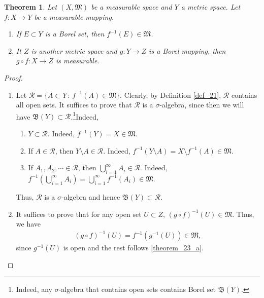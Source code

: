 \documentclass[11pt]{book}
\newtheorem{theorem}{Theorem}[chapter]
\theoremstyle{definition}
\numberwithin{equation}{chapter}
\def\BB{\mathfrak{B}}
\begin{document}
\begin{theorem}\label{theorem_23}
Let $(X,\mathfrak{M})$ be a measurable space and $Y$ a metric space. Let $f:X\to Y$ be a measurable mapping.
\begin{enumerate}[label=(\alph*)]
    \item If $E \subset Y$ is a Borel set, then $f^{-1}(E) \in \mathfrak{M}$.\label{theorem_23_a}
    
    \item It $Z$ is another metric space and $g:Y\to Z$ is a Borel mapping, then $g\circ f:X \to Z$ is measurable.
\end{enumerate}
\end{theorem}
\begin{proof}
~\begin{enumerate}[label=(\alph*)]
    \item Let $\mathcal{R} = \{A \subset Y\,:\, f^{-1}(A) \in \mathfrak{M}\}$. Clearly, by Definition \ref{def_21}, $\mathcal{R}$ contains all open sets. It suffices to prove that $\mathcal{R}$ is a $\sigma$-algebra, since then we will have $\BB(Y) \subset \mathcal{R}$.\footnote{Indeed, any $\sigma$-algebra that contains open sets contains Borel set $\BB(Y)$.}Indeed, 
    \begin{enumerate}[label=\arabic*)]
        \item $Y \subset \mathcal{R}$. Indeed, $f^{-1}(Y) = X \in \mathfrak{M}$.
        
        \item If $A \in \mathcal{R}$, then $Y \setminus A \in \mathcal{R}$. Indeed, $f^{-1}(Y\setminus A) = X \setminus f^{-1}(A) \in \mathfrak{M}$.
        
        \item If $A_1, A_2, \cdots \in \mathcal{R}$, then $\bigcup^\infty_{i=1}A_i \in \mathcal{R}$. Indeed, $f^{-1}\left(\bigcup^\infty_{i=1}A_i\right) = \bigcup^\infty_{i=1} f^{-1}(A_i) \in \mathfrak{M}$.
    \end{enumerate}
    Thus, $\mathcal{R}$ is a $\sigma$-algebra and hence $\BB(Y) \subset \mathcal{R}$.
    
    \item It suffices to prove that for any open set $U \subset Z$, $(g\circ f)^{-1}(U) \in \mathfrak{M}$. Thus, we have
    \begin{align*}
        (g\circ f)^{-1}(U) = f^{-1} \left(g^{-1}(U)\right) \in \mathfrak{M},
    \end{align*}
    since $g^{-1}(U)$ is open and the rest follows \ref{theorem_23_a}.
\end{enumerate}
\end{proof}
\end{document}
